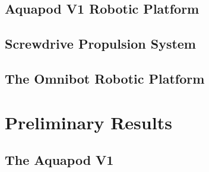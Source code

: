 	
	\subsection{Aquapod V1 Robotic Platform}
	

	\clearpage
	\subsection{Screwdrive Propulsion System}
	
	
	\clearpage
	\subsection{The Omnibot Robotic Platform}
	\label{sec:omnibot}
	







\section{Preliminary Results}

	\subsection{The Aquapod V1}
	




